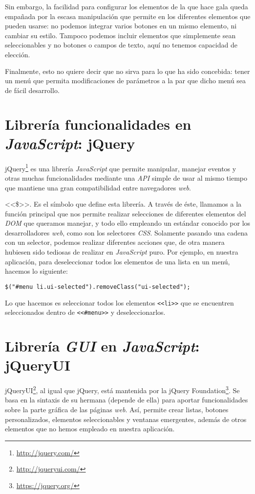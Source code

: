 {Sin embargo, la facilidad para configurar los elementos de la que hace gala queda empañada por la escasa manipulación que permite en los diferentes elementos que pueden usarse: no podemos integrar varios botones en un mismo elemento, ni cambiar su estilo. Tampoco podemos incluir elementos que simplemente sean seleccionables y no botones o campos de texto, aquí no tenemos capacidad de elección.

Finalmente, esto no quiere decir que no sirva para lo que ha sido concebida: tener un menú que permita modificaciones de parámetros a la par que dicho menú sea de fácil desarrollo.

\section{Librería funcionalidades en \textit{JavaScript}: jQuery}
jQuery\footnote{\url{http://jquery.com/}} es una librería \textit{JavaScript} que permite manipular, manejar eventos y otras muchas funcionalidades mediante una \textit{API} simple de usar al mismo tiempo que mantiene una gran compatibilidad entre navegadores \textit{web}.

<<\$>>. Es el símbolo que define esta librería. A través de éste, llamamos a la función principal que nos permite realizar selecciones de diferentes elementos del \textit{DOM} que queramos manejar, y todo ello empleando un estándar conocido por los desarrolladores \textit{web}, como son los selectores \textit{CSS}.
Solamente pasando una cadena con un selector, podemos realizar diferentes acciones que, de otra manera hubiesen sido tediosas de realizar en \textit{JavaScript} puro. Por ejemplo, en nuestra aplicación, para deseleccionar todos los elementos de una lista en un menú, hacemos lo siguiente:

\verb|$("#menu li.ui-selected").removeClass("ui-selected");|

Lo que hacemos es seleccionar todos los elementos \texttt{<<li>>} que se encuentren seleccionados dentro de \texttt{<<\#menu>>} y deseleccionarlos.

\section{Librería \textit{GUI} en \textit{JavaScript}: jQueryUI}
jQueryUI\footnote{\url{http://jqueryui.com/}}, al igual que jQuery, está mantenida por la jQuery Foundation\footnote{\url{https://jquery.org/}}. Se basa en la sintaxis de su hermana (depende de ella) para aportar funcionalidades sobre la parte gráfica de las páginas \textit{web}. Así, permite crear listas, botones personalizados, elementos seleccionables y ventanas emergentes, además de otros elementos que no hemos empleado en nuestra aplicación.

}
